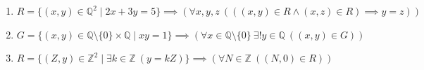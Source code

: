 \documentclass[11pt,a4paper]{article}
\begin{document}
\begin{enumerate}
\item $\displaystyle R = \{(x, y) \in \mathbb{Q}^{2} \mid 2x + 3y = 5\} \implies (\forall x, y, z\ (((x, y) \in R \land (x, z) \in R) \implies y = z))$
\item $\displaystyle G = \{(x, y) \in \mathbb{Q} \setminus \{0\} \times \mathbb{Q} \mid xy = 1\} \implies (\forall x \in \mathbb{Q} \setminus \{0\}\ \exists! y \in \mathbb{Q}\ ((x, y) \in G))$
\item $\displaystyle R = \{(Z, y) \in \mathbb{Z}^{2} \mid \exists k \in \mathbb{Z}\ (y = kZ)\} \implies (\forall N \in \mathbb{Z}\ ((N, 0) \in R))$
\end{enumerate}
\end{document}
